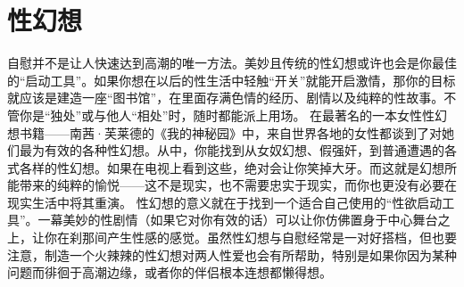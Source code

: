 \documentclass[12pt,UTF8,openany]{ctexbook}
\begin{document}
\section{性幻想}
自慰并不是让人快速达到高潮的唯一方法。美妙且传统的性幻想或许也会是你最佳的“启动工具”。如果你想在以后的性生活中轻触“开关”就能开启激情，那你的目标就应该是建造一座“图书馆”，在里面存满色情的经历、剧情以及纯粹的性故事。不管你是“独处”或与他人“相处”时，随时都能派上用场。
在最著名的一本女性性幻想书籍——南茜·芙莱德的《我的神秘园》中，来自世界各地的女性都谈到了对她们最为有效的各种性幻想。从中，你能找到从女奴幻想、假强奸，到普通遭遇的各式各样的性幻想。如果在电视上看到这些，绝对会让你笑掉大牙。而这就是幻想所能带来的纯粹的愉悦——这不是现实，也不需要忠实于现实，而你也更没有必要在现实生活中将其重演。
性幻想的意义就在于找到一个适合自己使用的“性欲启动工具”。一幕美妙的性剧情（如果它对你有效的话）可以让你仿佛置身于中心舞台之上，让你在刹那间产生性感的感觉。虽然性幻想与自慰经常是一对好搭档，但也要注意，制造一个火辣辣的性幻想对两人性爱也会有所帮助，特别是如果你因为某种问题而徘徊于高潮边缘，或者你的伴侣根本连想都懒得想。
\end{document}
